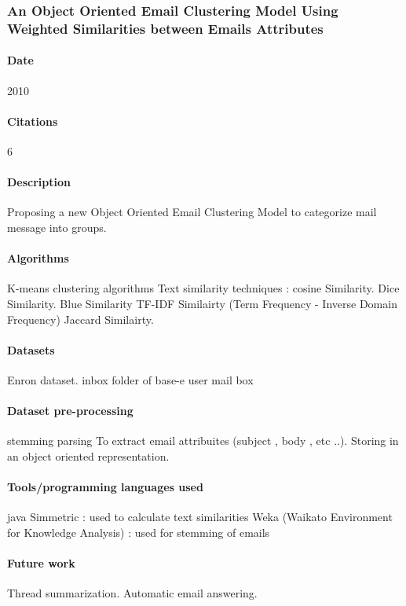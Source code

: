 \documentclass[12pt]{article}
\begin{document}
\subsubsection{An Object Oriented Email Clustering Model Using Weighted Similarities between Emails Attributes}
\paragraph{Date} 2010
\paragraph{Citations}6
\paragraph{Description}
Proposing a new Object Oriented Email Clustering Model to categorize mail message into groups.

\paragraph{Algorithms}
K-means clustering algorithms
Text similarity techniques :
cosine Similarity.
Dice Similarity.
Blue Similarity
TF-IDF Similairty (Term Frequency - Inverse Domain Frequency)
Jaccard Similairty.

\paragraph{Datasets}
Enron dataset.
inbox folder of base-e user mail box

\paragraph{Dataset pre-processing}
stemming
parsing
To extract email attribuites (subject , body , etc ..).
Storing in an object oriented representation.

\paragraph{Tools/programming languages used}
java
Simmetric : used to calculate text similarities
Weka (Waikato Environment for Knowledge Analysis) : used for stemming of emails

\paragraph{Future work}
Thread summarization.
Automatic email answering.
\end{document}

